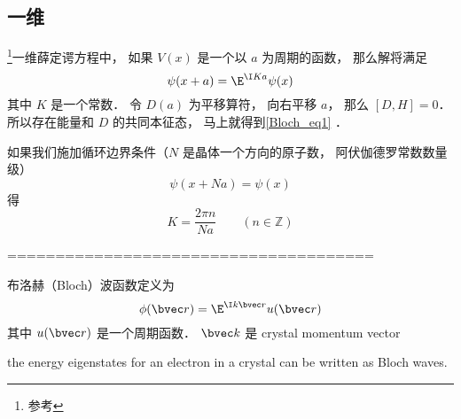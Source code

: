 
\begin{issues}
\issueDraft
\end{issues}


\subsection{一维}
\footnote{参考\cite{GriffQ}}一维薛定谔方程中， 如果 $V(x)$ 是一个以 $a$ 为周期的函数， 那么解将满足
\begin{equation}\label{Bloch_eq1}
\psi(x+a) = \E^{\I K a}\psi(x)
\end{equation}
其中 $K$ 是一个常数． 令 $D(a)$ 为平移算符， 向右平移 $a$， 那么 $[D,H] = 0$． 所以存在能量和 $D$ 的共同本征态， 马上就得到\autoref{Bloch_eq1} ．

如果我们施加循环边界条件（$N$ 是晶体一个方向的原子数， 阿伏伽德罗常数数量级）
\begin{equation}
\psi(x+Na) = \psi(x)
\end{equation}
得
\begin{equation}
K = \frac{2\pi n}{Na} \qquad (n \in \mathbb Z)
\end{equation}


======================================

布洛赫（Bloch）波函数定义为
\begin{equation}
\phi(\bvec r) = \E^{\I k \bvec r} u(\bvec r)
\end{equation}
其中 $u(\bvec r)$ 是一个周期函数． $\bvec k$ 是 crystal momentum vector

the energy eigenstates for an electron in a crystal can be written as Bloch waves.

